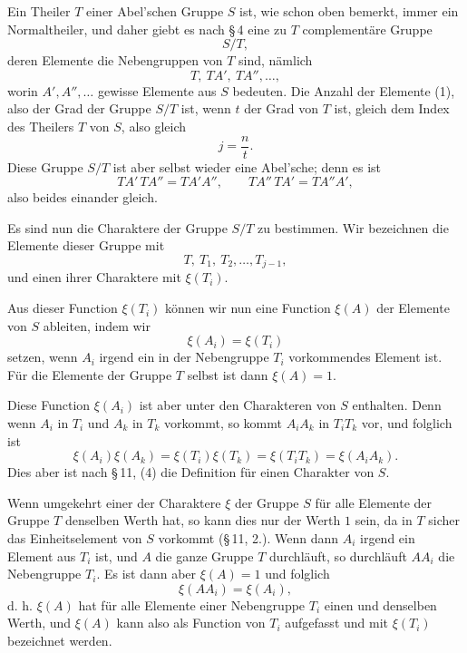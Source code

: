 \documentclass[11pt]{article}
\begin{document}
Ein Theiler $T$ einer Abel'schen Gruppe $S$ ist, wie schon oben bemerkt, immer ein Normaltheiler, und daher giebt es nach \S\,4 eine zu $T$ complementäre Gruppe
\[
S/T,
\]
deren Elemente die Nebengruppen von $T$ sind, nämlich
\begin{equation}
T,
\ TA',
\ TA'',
\ldots,
\tag{1}
\end{equation}
worin $A',A'',\ldots$ gewisse Elemente aus $S$ bedeuten. Die Anzahl der Elemente (1), also der Grad der Gruppe $S/T$ ist, wenn $t$ der Grad von $T$ ist, gleich dem Index des Theilers $T$ von $S$, also gleich
\[
j=\frac nt.
\]
Diese Gruppe $S/T$ ist aber selbst wieder eine Abel'sche; denn es ist
\[
TA'\,TA''=TA'A'',
\qquad
TA''\,TA'=TA''A',
\]
also beides einander gleich.

Es sind nun die Charaktere der Gruppe $S/T$ zu bestimmen. Wir bezeichnen die Elemente dieser Gruppe mit
\begin{equation}
T,
\ T_1,
\ T_2,
\ldots,
T_{j-1},
\tag{2}
\end{equation}
und einen ihrer Charaktere mit $\xi(T_i)$.

Aus dieser Function $\xi(T_i)$ können wir nun eine Function $\xi(A)$ der Elemente von $S$ ableiten, indem wir
\begin{equation}
\xi(A_i)=\xi(T_i)
\tag{3}
\end{equation}
setzen, wenn $A_i$ irgend ein in der Nebengruppe $T_i$ vorkommendes Element ist. Für die Elemente der Gruppe $T$ selbst ist dann $\xi(A)=1$.

Diese Function $\xi(A_i)$ ist aber unter den Charakteren von $S$ enthalten. Denn wenn $A_i$ in $T_i$ und $A_k$ in $T_k$ vorkommt, so kommt $A_iA_k$ in $T_iT_k$ vor, und folglich ist
\begin{equation}
\xi(A_i)\xi(A_k)=\xi(T_i)\xi(T_k)=\xi(T_iT_k)=\xi(A_iA_k).
\tag{4}
\end{equation}
Dies aber ist nach \S\,11, (4) die Definition für einen Charakter von $S$.

Wenn umgekehrt einer der Charaktere $\xi$ der Gruppe $S$ für alle Elemente der Gruppe $T$ denselben Werth hat, so kann dies nur der Werth $1$ sein, da in $T$ sicher das Einheitselement von $S$ vorkommt (\S\,11, 2.). Wenn dann $A_i$ irgend ein Element aus $T_i$ ist, und $A$ die ganze Gruppe $T$ durchläuft, so durchläuft $AA_i$ die Nebengruppe $T_i$. Es ist dann aber $\xi(A)=1$ und folglich
\begin{equation}
\xi(AA_i)=\xi(A_i),
\tag{5}
\end{equation}
d. h. $\xi(A)$ hat für alle Elemente einer Nebengruppe $T_i$ einen und denselben Werth, und $\xi(A)$ kann also als Function von $T_i$ aufgefasst und mit $\xi(T_i)$ bezeichnet werden.
\end{document}
